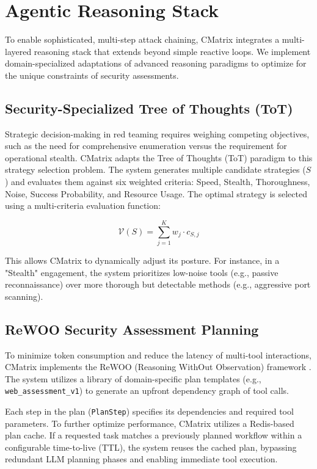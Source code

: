 \documentclass[conference,compsoc]{IEEEtran}
\begin{document}
\section{Agentic Reasoning Stack}
To enable sophisticated, multi-step attack chaining, CMatrix integrates a multi-layered reasoning stack that extends beyond simple reactive loops. We implement domain-specialized adaptations of advanced reasoning paradigms to optimize for the unique constraints of security assessments.

\subsection{Security-Specialized Tree of Thoughts (ToT)}
Strategic decision-making in red teaming requires weighing competing objectives, such as the need for comprehensive enumeration versus the requirement for operational stealth. CMatrix adapts the Tree of Thoughts (ToT) \cite{tot} paradigm to this strategy selection problem. The system generates multiple candidate strategies ($S$) and evaluates them against six weighted criteria: Speed, Stealth, Thoroughness, Noise, Success Probability, and Resource Usage. The optimal strategy is selected using a multi-criteria evaluation function:

\begin{equation}
\mathcal{V}(S) = \sum_{j=1}^{K} w_j \cdot c_{S,j}
\end{equation}

This allows CMatrix to dynamically adjust its posture. For instance, in a "Stealth" engagement, the system prioritizes low-noise tools (e.g., passive reconnaissance) over more thorough but detectable methods (e.g., aggressive port scanning).

\subsection{ReWOO Security Assessment Planning}
To minimize token consumption and reduce the latency of multi-tool interactions, CMatrix implements the ReWOO (Reasoning WithOut Observation) framework \cite{rewoo}. The system utilizes a library of domain-specific plan templates (e.g., \texttt{web\_assessment\_v1}) to generate an upfront dependency graph of tool calls.

Each step in the plan (\texttt{PlanStep}) specifies its dependencies and required tool parameters. To further optimize performance, CMatrix utilizes a Redis-based plan cache. If a requested task matches a previously planned workflow within a configurable time-to-live (TTL), the system reuses the cached plan, bypassing redundant LLM planning phases and enabling immediate tool execution.
\end{document}
